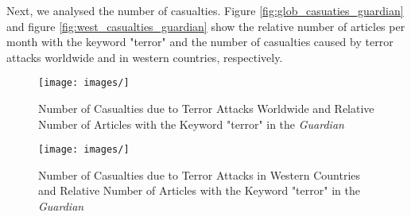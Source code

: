 Next, we analysed the number of casualties. Figure \autoref{fig:glob_casuaties_guardian} and figure \autoref{fig:west_casualties_guardian} show the relative number of articles per month with the keyword "terror" and the number of casualties caused by terror attacks worldwide and in western countries, respectively. 

\begin{figure}
  \centering
    \texttt{[image: images/]}
    \caption{Number of Casualties due to Terror Attacks Worldwide and Relative Number of Articles with the Keyword "terror" in the \textit{Guardian}}
    \label{fig:glob_casualties_guardian}
\end{figure}

\begin{figure}
  \centering
    \texttt{[image: images/]}
    \caption{Number of Casualties due to Terror Attacks in Western Countries and Relative Number of Articles with the Keyword "terror" in the \textit{Guardian}}
    \label{fig:west_casualties_guardian}
\end{figure}
 
